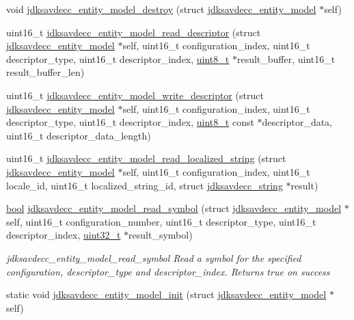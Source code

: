 \begin{DoxyCompactItemize}
\item 
void \hyperlink{group__entity_ga99ae198c03cdff653a3c59f07edec038}{jdksavdecc\+\_\+entity\+\_\+model\+\_\+destroy} (struct \hyperlink{structjdksavdecc__entity__model}{jdksavdecc\+\_\+entity\+\_\+model} $\ast$self)
\item 
uint16\+\_\+t \hyperlink{group__entity_ga1593e02d7c94729d30b20ca383cbe385}{jdksavdecc\+\_\+entity\+\_\+model\+\_\+read\+\_\+descriptor} (struct \hyperlink{structjdksavdecc__entity__model}{jdksavdecc\+\_\+entity\+\_\+model} $\ast$self, uint16\+\_\+t configuration\+\_\+index, uint16\+\_\+t descriptor\+\_\+type, uint16\+\_\+t descriptor\+\_\+index, \hyperlink{stdint_8h_aba7bc1797add20fe3efdf37ced1182c5}{uint8\+\_\+t} $\ast$result\+\_\+buffer, uint16\+\_\+t result\+\_\+buffer\+\_\+len)
\item 
uint16\+\_\+t \hyperlink{group__entity_ga453edca986f2aade8f91748b833ab6cc}{jdksavdecc\+\_\+entity\+\_\+model\+\_\+write\+\_\+descriptor} (struct \hyperlink{structjdksavdecc__entity__model}{jdksavdecc\+\_\+entity\+\_\+model} $\ast$self, uint16\+\_\+t configuration\+\_\+index, uint16\+\_\+t descriptor\+\_\+type, uint16\+\_\+t descriptor\+\_\+index, \hyperlink{stdint_8h_aba7bc1797add20fe3efdf37ced1182c5}{uint8\+\_\+t} const $\ast$descriptor\+\_\+data, uint16\+\_\+t descriptor\+\_\+data\+\_\+length)
\item 
uint16\+\_\+t \hyperlink{group__entity_ga54cd1e4df497865a5cb335a6f3d2e84d}{jdksavdecc\+\_\+entity\+\_\+model\+\_\+read\+\_\+localized\+\_\+string} (struct \hyperlink{structjdksavdecc__entity__model}{jdksavdecc\+\_\+entity\+\_\+model} $\ast$self, uint16\+\_\+t configuration\+\_\+index, uint16\+\_\+t locale\+\_\+id, uint16\+\_\+t localized\+\_\+string\+\_\+id, struct \hyperlink{structjdksavdecc__string}{jdksavdecc\+\_\+string} $\ast$result)
\item 
\hyperlink{avb__gptp_8h_af6a258d8f3ee5206d682d799316314b1}{bool} \hyperlink{group__entity_ga01eb49a092517bac452dbe8c37035d88}{jdksavdecc\+\_\+entity\+\_\+model\+\_\+read\+\_\+symbol} (struct \hyperlink{structjdksavdecc__entity__model}{jdksavdecc\+\_\+entity\+\_\+model} $\ast$self, uint16\+\_\+t configuration\+\_\+number, uint16\+\_\+t descriptor\+\_\+type, uint16\+\_\+t descriptor\+\_\+index, \hyperlink{parse_8c_a6eb1e68cc391dd753bc8ce896dbb8315}{uint32\+\_\+t} $\ast$result\+\_\+symbol)
\begin{DoxyCompactList}\small\item\em jdksavdecc\+\_\+entity\+\_\+model\+\_\+read\+\_\+symbol Read a symbol for the specified configuration, descriptor\+\_\+type and descriptor\+\_\+index. Returns true on success \end{DoxyCompactList}\item 
static void \hyperlink{group__entity_gabd1049d066913d2480ae304c8014deed}{jdksavdecc\+\_\+entity\+\_\+model\+\_\+init} (struct \hyperlink{structjdksavdecc__entity__model}{jdksavdecc\+\_\+entity\+\_\+model} $\ast$self)
\end{DoxyCompactItemize}


